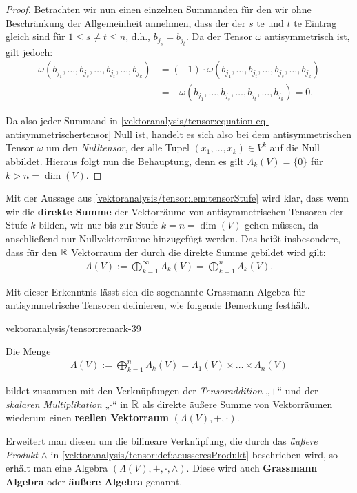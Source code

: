 \begin{proof}
\par
Betrachten wir nun einen einzelnen Summanden für den wir ohne Beschränkung der Allgemeinheit annehmen, dass der der \(s\) te und \(t\) te Eintrag gleich sind für \(1 \leq s \neq t \leq n\), d.h., \(b_{j_s}=b_{j_t}\).
Da der Tensor \(\omega\) antisymmetrisch ist, gilt jedoch:
\begin{align*}
\omega(b_{j_1}, \ldots, b_{j_s}, \ldots, b_{j_t}, \ldots, b_{j_k}) &= (-1) \cdot \omega(b_{j_1}, \ldots, b_{j_t}, \ldots, b_{j_s}, \ldots, b_{j_k}) \\
&= - \omega(b_{j_1}, \ldots, b_{j_s}, \ldots, b_{j_t}, \ldots, b_{j_k}) = 0.
\end{align*}
\par
Da also jeder Summand in \cref{vektoranalysis/tensor:equation-eq-antisymmetrischertensor} Null ist, handelt es sich also bei dem antisymmetrischen Tensor \(\omega\) um den \emph{Nulltensor}, der alle Tupel \((x_1, \ldots, x_k) \in V^k\) auf die Null abbildet.
Hieraus folgt nun die Behauptung, denn es gilt \(\Lambda_k(V) = \lbrace 0 \rbrace\) für \(k > n =\operatorname{dim}(V)\).
\end{proof}

\par
Mit der Aussage aus \cref{vektoranalysis/tensor:lem:tensorStufe} wird klar, dass wenn wir die \textbf{direkte Summe} der Vektorräume von antisymmetrischen Tensoren der Stufe \(k\) bilden, wir nur bis zur Stufe \(k = n = \operatorname{dim}(V)\) gehen müssen, da anschließend nur Nullvektorräume hinzugefügt werden.
Das heißt insbesondere, dass für den \(\mathbb{R}\) Vektorraum der durch die direkte Summe gebildet wird gilt:
\begin{align*}
\Lambda(V) := \bigoplus_{k=1}^\infty \Lambda_k(V) = \bigoplus_{k=1}^n \Lambda_k(V).
\end{align*}
\par
Mit dieser Erkenntnis lässt sich die sogenannte Grassmann Algebra für antisymmetrische Tensoren definieren, wie folgende Bemerkung festhält.
\begin{remark}{}{vektoranalysis/tensor:remark-39}



\par
Die Menge
\begin{align*}
\Lambda(V) := \bigoplus_{k=1}^n \Lambda_k(V) = \Lambda_1(V) \times \ldots \times \Lambda_n(V)
\end{align*}
\par
bildet zusammen mit den Verknüpfungen der \emph{Tensoraddition} „\(+\)“ und der \emph{skalaren Multiplikation} „\(\cdot\)“ in \(\mathbb{R}\) als direkte äußere Summe von Vektorräumen wiederum einen \textbf{reellen Vektorraum} \((\Lambda(V), +, \cdot)\).

\par
Erweitert man diesen um die bilineare Verknüpfung, die durch das \emph{äußere Produkt} \(\wedge\) in \cref{vektoranalysis/tensor:def:aeusseresProdukt} beschrieben wird, so erhält man eine Algebra \((\Lambda(V), +, \cdot, \wedge)\).
Diese wird auch \textbf{Grassmann Algebra} oder \textbf{äußere Algebra} genannt.
\end{remark}


